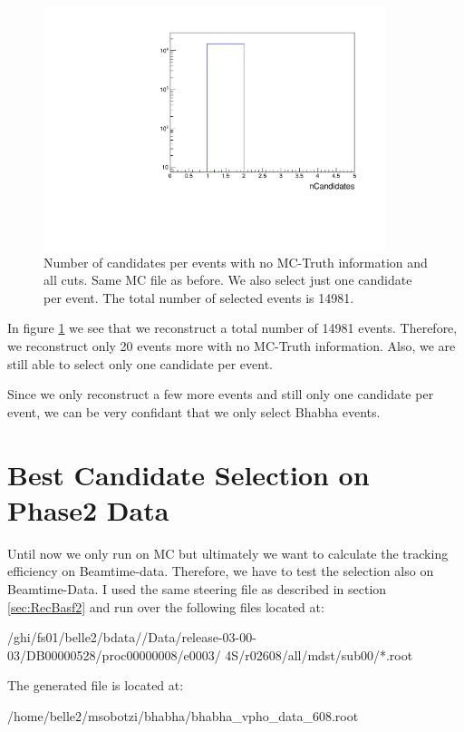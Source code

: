 \documentclass[a4paper,11pt,twosided,final,german,openbib,pdftex,listof=totoc,bibliography=totoc]{scrbook}
\begin{document}
\begin{figure}[h!]
	\centering
	\includegraphics[width=10cm]{Cuts/nCandNoMCInfo.pdf}
	\caption[Number Of Candidates Per Event With No MC-Truth Info (All Cuts)]{Number of candidates per events with no MC-Truth information and all cuts. Same MC file as before. We also select just one candidate per event. The total number of selected events is 14981.}
	\label{fig:nCandNoMCInfo}
\end{figure}

In figure \ref{fig:nCandNoMCInfo} we see that we reconstruct a total number of 14981 events. Therefore, we reconstruct only 20 events more with no MC-Truth information. Also, we are still able to select only one candidate per event. 

Since we only reconstruct a few more events and still only one candidate per event, we can be very confidant that we only select Bhabha events.

\section{Best Candidate Selection on Phase2 Data}
\label{sec:SelectingBhabhaData}

Until now we only run on MC but ultimately we want to calculate the tracking efficiency on Beamtime-data. Therefore, we have to test the selection also on Beamtime-Data. I used the same steering file as described in section \ref{sec:RecBasf2} and run over the following files located at:
\newline

/ghi/fs01/belle2/bdata//Data/release-03-00-03/DB00000528/proc00000008/e0003/
4S/r02608/all/mdst/sub00/*.root
\newline

The generated file is located at:

/home/belle2/msobotzi/bhabha/bhabha\_vpho\_data\_608.root
\end{document}
